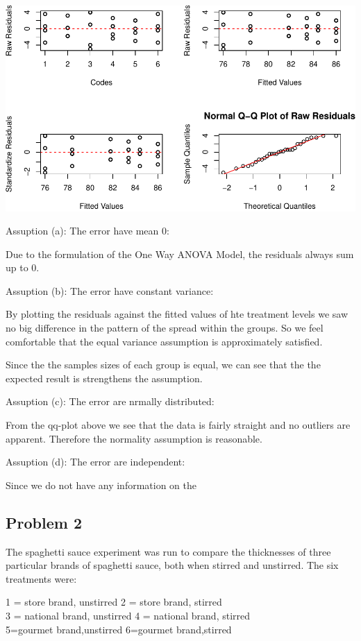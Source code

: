 \documentclass[12pt,]{article}
\begin{document}
\includegraphics{Markdown_HW_5_files/figure-latex/unnamed-chunk-5-1.pdf}

Assuption (a): The error have mean 0:

Due to the formulation of the One Way ANOVA Model, the residuals always
sum up to 0.

Assuption (b): The error have constant variance:

By plotting the residuals against the fitted values of hte treatment
levels we saw no big difference in the pattern of the spread within the
groups. So we feel comfortable that the equal variance assumption is
approximately satisfied.

Since the the samples sizes of each group is equal, we can see that the
the expected result is strengthens the assumption.

Assuption (c): The error are nrmally distributed:

From the qq-plot above we see that the data is fairly straight and no
outliers are apparent. Therefore the normality assumption is reasonable.

Assuption (d): The error are independent:

Since we do not have any information on the

\subsection{Problem 2}\label{problem-2}

The spaghetti sauce experiment was run to compare the thicknesses of
three particular brands of spaghetti sauce, both when stirred and
unstirred. The six treatments were:

\begin{center}
1 = store brand, unstirred 2 = store brand, stirred\\
3 = national brand, unstirred 4 = national brand, stirred \\ 
5=gourmet brand,unstirred 6=gourmet brand,stirred
\end{center}
\end{document}

